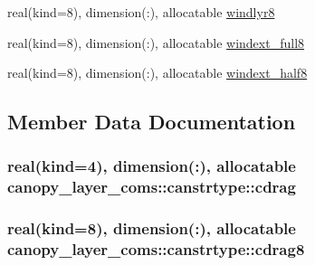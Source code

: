 \begin{DoxyCompactItemize}
\item 
real(kind=8), dimension(\+:), allocatable \hyperlink{structcanopy__layer__coms_1_1canstrtype_ad29af3fcb9a0ed4dc4985eb8f1714283}{windlyr8}
\item 
real(kind=8), dimension(\+:), allocatable \hyperlink{structcanopy__layer__coms_1_1canstrtype_a3181c359a50b42145fcc853de4f37613}{windext\+\_\+full8}
\item 
real(kind=8), dimension(\+:), allocatable \hyperlink{structcanopy__layer__coms_1_1canstrtype_a42b218a7ffe018a0a4f6e753471ff11d}{windext\+\_\+half8}
\end{DoxyCompactItemize}


\subsection{Member Data Documentation}
\hypertarget{structcanopy__layer__coms_1_1canstrtype_a5ae1b10bcffa38619368cfa76a022c4e}{}
\subsubsection[{cdrag}]{\setlength{\rightskip}{0pt plus 5cm}real(kind=4), dimension(\+:), allocatable canopy\+\_\+layer\+\_\+coms\+::canstrtype\+::cdrag}\label{structcanopy__layer__coms_1_1canstrtype_a5ae1b10bcffa38619368cfa76a022c4e}
\hypertarget{structcanopy__layer__coms_1_1canstrtype_a3a3de790a580c68fd8a4f826c5f3f315}{}
\subsubsection[{cdrag8}]{\setlength{\rightskip}{0pt plus 5cm}real(kind=8), dimension(\+:), allocatable canopy\+\_\+layer\+\_\+coms\+::canstrtype\+::cdrag8}\label{structcanopy__layer__coms_1_1canstrtype_a3a3de790a580c68fd8a4f826c5f3f315}
\hypertarget{structcanopy__layer__coms_1_1canstrtype_affa32f59db639149948370654c88a4a8}{}
